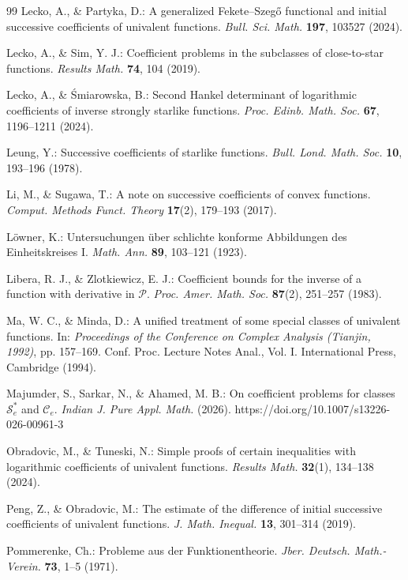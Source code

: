 \documentclass[11pt]{article}
\numberwithin{equation}{section}
\begin{document}
\begin{thebibliography}{99}
 Lecko, A., \& Partyka, D.: A generalized Fekete--Szeg\H{o} functional and initial successive coefficients of univalent functions. \emph{Bull. Sci. Math.} \textbf{197}, 103527 (2024).

 Lecko, A., \& Sim, Y. J.: Coefficient problems in the subclasses of close-to-star functions. \emph{Results Math.} \textbf{74}, 104 (2019).

 Lecko, A., \& \'{S}miarowska, B.: Second Hankel determinant of logarithmic coefficients of inverse strongly starlike functions. \emph{Proc. Edinb. Math. Soc.} \textbf{67}, 1196--1211 (2024).

 Leung, Y.: Successive coefficients of starlike functions. \emph{Bull. Lond. Math. Soc.} \textbf{10}, 193--196 (1978).

 Li, M., \& Sugawa, T.: A note on successive coefficients of convex functions. \emph{Comput. Methods Funct. Theory} \textbf{17}(2), 179--193 (2017).

 L\"{o}wner, K.: Untersuchungen \"uber schlichte konforme Abbildungen des Einheitskreises I. \emph{Math. Ann.} \textbf{89}, 103--121 (1923).

 Libera, R. J., \& Zlotkiewicz, E. J.: Coefficient bounds for the inverse of a function with derivative in $\mathcal{P}$. \emph{Proc. Amer. Math. Soc.} \textbf{87}(2), 251--257 (1983).

 Ma, W. C., \& Minda, D.: A unified treatment of some special classes of univalent functions. In: \emph{Proceedings of the Conference on Complex Analysis (Tianjin, 1992)}, pp. 157--169. Conf. Proc. Lecture Notes Anal., Vol. I. International Press, Cambridge (1994).

 Majumder, S., Sarkar, N., \& Ahamed, M. B.: On coefficient problems for classes $\mathcal{S}_{e}^{*}$ and $\mathcal{C}_e$. \emph{Indian J. Pure Appl. Math.} (2026). https://doi.org/10.1007/s13226-026-00961-3

 Obradovic, M., \& Tuneski, N.: Simple proofs of certain inequalities with logarithmic coefficients of univalent functions. \emph{Results Math.} \textbf{32}(1), 134--138 (2024).

 Peng, Z., \& Obradovic, M.: The estimate of the difference of initial successive coefficients of univalent functions. \emph{J. Math. Inequal.} \textbf{13}, 301--314 (2019).

 Pommerenke, Ch.: Probleme aus der Funktionentheorie. \emph{Jber. Deutsch. Math.-Verein.} \textbf{73}, 1--5 (1971).


\end{thebibliography}
\end{document}
